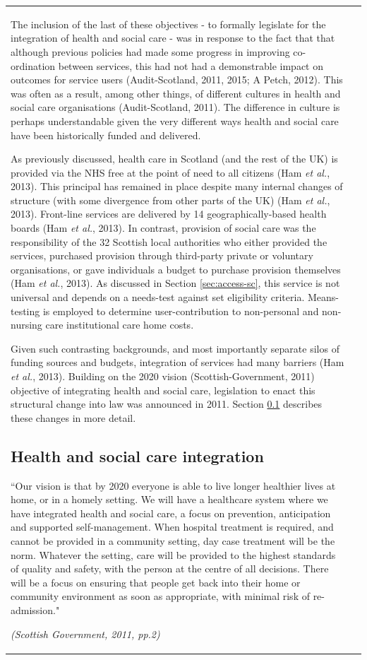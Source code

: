 \documentclass[12pt,a4paper,oneside,table]{report}
\begin{document}
\begin{tabular}[t]{ll}
The inclusion of the last of these objectives - to formally legislate
for the integration of health and social care - was in response to the
fact that that although previous policies had made some progress in
improving co-ordination between services, this had not had a
demonstrable impact on outcomes for service users (Audit-Scotland, 2011,
2015; A Petch, 2012). This was often as a result, among other things, of
different cultures in health and social care organisations
(Audit-Scotland, 2011). The difference in culture is perhaps
understandable given the very different ways health and social care have
been historically funded and delivered.

As previously discussed, health care in Scotland (and the rest of the
UK) is provided via the NHS free at the point of need to all citizens
(Ham \emph{et al.}, 2013). This principal has remained in place despite
many internal changes of structure (with some divergence from other
parts of the UK) (Ham \emph{et al.}, 2013). Front-line services are
delivered by 14 geographically-based health boards (Ham \emph{et al.},
2013). In contrast, provision of social care was the responsibility of
the 32 Scottish local authorities who either provided the services,
purchased provision through third-party private or voluntary
organisations, or gave individuals a budget to purchase provision
themselves (Ham \emph{et al.}, 2013). As discussed in Section
\ref{sec:access-sc}, this service is not universal and depends on a
needs-test against set eligibility criteria. Means-testing is employed
to determine user-contribution to non-personal and non-nursing care
institutional care home costs.

Given such contrasting backgrounds, and most importantly separate silos
of funding sources and budgets, integration of services had many
barriers (Ham \emph{et al.}, 2013). Building on the 2020 vision
(Scottish-Government, 2011) objective of integrating health and social
care, legislation to enact this structural change into law was announced
in 2011. Section \ref{subsec:hsc-integration} describes these changes in
more detail.

\subsection{Health and social care integration}\label{subsec:hsc-integration}

\epigraph{``Our vision is that by 2020 everyone is able to live longer healthier lives at home, or in a homely setting. We will have a healthcare system where we have integrated health and social care, a focus on prevention, anticipation and supported self-management. When hospital treatment is required, and cannot be provided in a community setting, day case treatment will be the norm. Whatever the setting, care will be provided to the highest standards of quality and safety, with the person at the centre of all decisions. There will be a focus on ensuring that people get back into their home or community environment as soon as appropriate, with minimal risk of re-admission."}{\textit{(Scottish Government, 2011, pp.2)}}


\end{tabular}
\end{document}
